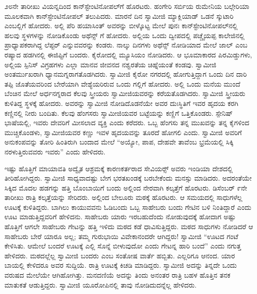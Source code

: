  ೨೮ನೇ ತಾರೀಖು ವಿಯನ್ನದಿಂದ ಕಾನ್‍ಸ್ಟೇಂಟಿನೋಪಲ್‍ಗೆ ಹೊರಟರು. ಹಂಗೇರಿ ಸರ್ಬಿಯ ರುಮೇನಿಯ ಬಲ್ಗೇರಿಯಾ ಮೂಲಕವಾಗಿ ಕಾನ್‍ಸ್ಟೇಂಟಿನೋಪಲ್‍ ತಲುಪಿದರು. ಮಾರನೆ ದಿನ ಸ್ವಾಮೀಜಿ ಮ್ಯಾಕ್ಲಿಯಾಡ್ ಒಡನೆ ಸ್ಕುಟಾರಿ ಎಂಬಲ್ಲಿಗೆ ಹೋದರು. ಅಲ್ಲಿ ಪೆರಿ ಹಯಾಸಿಂತ್ ಅವರನ್ನು ಬೀಳ್ಕೊಟ್ಟ ಮೇಲೆ ಪುನಃ ಕಾನ್‍ಸ್ಟೇಂಟಿನೋಪಲ್‍ನಲ್ಲಿ ಹಲವು ಸ್ಥಳಗಳನ್ನು ನೋಡಿಕೊಂಡು ಅಥೆನ್ಸ್ ಗೆ ಹೋದರು. ಅಲ್ಲಿಯ ಒಂದು ದ್ವೀಪದಲ್ಲಿ ಪಚ್ಚೈಯಪ್ಪ ಕಾಲೇಜಿನಲ್ಲಿ ಪ್ರಾಧ್ಯಾಪಕರಾಗಿದ್ದ ಲೆಪ್ಟರ್ ಎನ್ನುವವರನ್ನು ಕಂಡರು. ನಾಲ್ಕು ದಿನಗಳು ಅಥೆನ್ಸ್ ನೋಡಿಯಾದ ಮೇಲೆ ಜಾಲ್ ಎಂಬ ರಷ್ಯಾದ ಹಡಗಿನಲ್ಲಿ ಈಜಿಪ್ಟಿಗೆ ಬಂದರು. ಕೈರೋದಲ್ಲಿ ಮ್ಯೂಸಿಯಂ ನೋಡಿದರು. ಆ ಭೂಮಾಕಾರದ ಪಿರಮಿಡ್ಡುಗಳು, ಅಲ್ಲಿಯ ಸ್ಪಿನಿಸ್ ವಿಗ್ರಹಗಳು ಎಲ್ಲಾ ಮಾನವ ಜೀವನದ ನಶ್ವರತೆಯ ಚಿಹ್ನೆಯಂತೆ ಕಂಡವು. ಸ್ವಾಮೀಜಿ ಅಂತರ್ಮುಖರಾಗಿ ಧ್ಯಾನಮಗ್ನರಾಗತೊಡಗಿದರು. ಸ್ವಾಮೀಜಿ ಕೈರೋ ನಗರದಲ್ಲಿ ಹೋಗುತ್ತಿದ್ದಾಗ ಒಂದು ದಿನ ದಾರಿ ತಪ್ಪಿ ಜೊತೆಯವರಿಂದ ಬೇರೆಯಾಗಿ ವೇಶ್ಯೆಯರಿರುವ ಒಂದು ಗಲ್ಲಿಗೆ ಹೋದರು. ಅಲ್ಲಿ ಒಂದು ಮನೆಯ ಮುಂದೆ ಬೆಂಚಿನ ಮೇಲೆ ಅರ್ಧನಗ್ನರಾದ ಕೆಲವು ಸ್ತ್ರೀಯರು ಸ್ವಾಮೀಜಿಯವರನ್ನು ಕರೆಯತೊಡಗಿದರು. ಸ್ವಾಮೀಜಿ ಸ್ತ್ರೀಯರು ಕುಳಿತಿದ್ದ ಸ್ಥಳಕ್ಕೆ ಹೋದರು. ಅವರನ್ನು ಸ್ವಾಮೀಜಿ ನೋಡಿದೊಡನೆಯೇ ಅವರ ದುಃಸ್ಥಿತಿಗೆ ಇವರ ಹೃದಯ ಕರಗಿ ಕಣ್ಣಿನಲ್ಲಿ ನೀರು ಬಂದಿತು. ಕೆಲವು ಹೆಂಗಸರು ಸ್ವಾಮೀಜಿಯವರ ಬಟ್ಟೆಯನ್ನು ಕಣ್ಣಿಗೆ ಒತ್ತಿಕೊಂಡರು. ಸ್ಪೇನಿಷ್ ಭಾಷೆಯಲ್ಲಿ, ಇವರು ದೇವರಿಗೆ ಮೀಸಲಾದ ವ್ಯಕ್ತಿ ಎಂದು ಕರೆದರು. ಒಬ್ಬ ಹೆಂಗಸು ತನ್ನ ಮುಖವನ್ನು ತನ್ನ ಕೈಗಳಿಂದ ಮುಚ್ಚಿಕೊಂಡಳು, ಸ್ವಾಮೀಜಿಯವರ ಕಣ್ಣು ಇವಳ ಹೃದಯವನ್ನು ತೂರದೆ ಹೋಗಲಿ ಎಂದು. ಸ್ವಾಮೀಜಿ ಅವರಿಗೆ ಅನುಕಂಪವನ್ನು ತೋರಿ ಹಿಂತಿರುಗಿ ಬಂದಾದ ಮೇಲೆ “ಅಯ್ಯೋ, ಪಾಪ, ದೇಹವೇ ತಾವೆಂಬ ಭ್ರಮೆಯಲ್ಲಿ ಸಿಕ್ಕಿ ನರಳುತ್ತಿರುವವರು ಇವರು” ಎಂದು ಹೇಳಿದರು. 

 ಇಷ್ಟು ಹೊತ್ತಿಗೆ ಮಾಯಾವತಿ ಅದ್ವೈತ ಆಶ್ರಮಕ್ಕೆ ಕಾರಣಕರ್ತರಾದ ಸೇವಿಯರ್ಸ್‍‍ ಅವರು ಇಂಡಿಯಾ ದೇಶದಲ್ಲಿ ತೀರಿಹೋಗಿದ್ದರು. ಸ್ವಾಮೀಜಿ ಸಾಧ್ಯವಾದಷ್ಟು ಬೇಗ ಭರತಖಂಡಕ್ಕೆ ಬರಬೇಕೆಂದು ಮನಸ್ಸು ಮಾಡಿದರು. ಅದರಂತೆಯೇ ಸಿಕ್ಕಿದ ಮೊದಲ ಹಡಗನ್ನು ಹತ್ತಿ ಬೊಂಬಾಯಿಗೆ ಬಂದು ಅಲ್ಲಿಂದ ನೇರವಾಗಿ ಕಲ್ಕತ್ತೆಗೆ ಹೊರಟರು. ಡಿಸೆಂಬರ್ ೯ನೇ ತಾರೀಖು ರಾತ್ರಿ ಕಲ್ಕತ್ತೆಯನ್ನು ಸೇರಿದರು. ಅಲ್ಲಿಂದ ಬೇಲೂರು ಮಠಕ್ಕೆ ಹೊರಟರು. ಆ ಸಮಯದಲ್ಲಿ ಸಾಧುಗಳೆಲ್ಲ ಊಟಕ್ಕೆ ಕುಳಿತಿದ್ದರು. ಬಾಗಿಲು ಕಾಯುವವನು ಓಡಿಬಂದು ಒಬ್ಬ ಸಾಹೇಬರು ಬಂದು ಗೇಟಿನ ಬಳಿ ನಿಂತಿದ್ದಾರೆ ಎಂದು ಊಟ ಮಾಡುತ್ತಿದ್ದವರಿಗೆ ಹೇಳಿದನು. ಸಾಹೇಬರು ಯಾರು ಇರಬಹುದೆಂದು ನೋಡುವುದಕ್ಕೆ ಹೋದಾಗ ಅಷ್ಟು ಹೊತ್ತಿಗೆ ಆಗಲೇ ಸಾಹೇಬರು ಗೇಟನ್ನು ಹತ್ತಿ ಇಳಿದು ಮಠದ ಕಡೆ ಧಾವಿಸುತ್ತಿದ್ದರು. ಮಠದ ಸಾಧುಗಳು ನೋಡಿದರೆ ಆ ಸಾಹೇಬರು ಬೇರೆ ಯಾರೂ ಅಲ್ಲ; ತಮ್ಮ ಗುರುಭಾಯಿ ವಿವೇಕಾನಂದರೇ ಆಗಿದ್ದರು! ಸ್ವಾಮೀಜಿ “ಊಟದ ಗಂಟೆ ಕೇಳಿಸಿತು. ಆಮೇಲೆ ಬಂದರೆ ಊಟಕ್ಕೆ ಎಲ್ಲಿ ಸೊನ್ನೆ ಬೀಳುವುದೋ ಎಂದು ಗೇಟನ್ನ ಹಾರಿ ಬಂದೆ” ಎಂದು ನಗುತ್ತ ಹೇಳಿದರು. ಮಠದಲ್ಲೆಲ್ಲ ಸ್ವಾಮೀಜಿ ಬಂದರು ಎಂಬ ಸಂತೋಷ ವಾರ್ತೆ ಹಬ್ಬಿತು. ಎಲ್ಲರಿಗೂ ಆನಂದ. ಯಾರ ಬಾಯಲ್ಲಿ ಕೇಳಿದರೂ ಅವರ ಸುದ್ದಿಯೆ. ರಾತ್ರಿ ಊಟಕ್ಕೆ ಕಿಚಡಿ ಮಾಡಿದ್ದರು. ಸ್ವಾಮೀಜಿ ಅದನ್ನು ತಿನ್ನದೇ ಒಂದು ವರುಷದ ಮೇಲೆಯೇ ಆಗಿಹೋಗಿತ್ತು. ಮನದಣಿಯೆ ಅದನ್ನು ತಿಂದು ಅನಂತರ ರಾತ್ರಿ ಬಹಳ ಹೊತ್ತಿನ ತನಕ ಮಾತುಕತೆ ಆಡುತ್ತಿದ್ದರು. ಸ್ವಾಮೀಜಿ ಯೂರೋಪಿನಲ್ಲಿ ತಾವು ನೋಡಿದುದನ್ನೆಲ್ಲ ಹೇಳಿದರು. 

